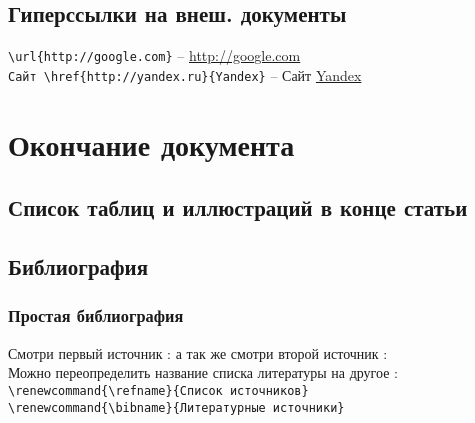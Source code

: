 \documentclass[a4paper,12pt]{article}%
\theoremstyle{plain}%
\theoremstyle{definition}%
\theoremstyle{remark}%
\begin{document}
\subsection{Гиперссылки на внеш. документы}

\verb|\url{http://google.com}| --
\url{http://google.com} \\%
\verb|Сайт \href{http://yandex.ru}{Yandex}| --
Сайт \href{http://yandex.ru}{Yandex}%



\section{Окончание документа}
\subsection{Список таблиц и иллюстраций в конце статьи}

\listoffigures%

\listoftables%



\subsection{Библиография}

\subsubsection{Простая библиография}

Смотри первый источник : \cite{qwerty}
а так же смотри второй источник : \cite{fama} \\

Можно переопределить название списка литературы на другое : \\
\verb|\renewcommand{\refname}{Список источников}| \\%
\verb|\renewcommand{\bibname}{Литературные источники}|%
\end{document}
